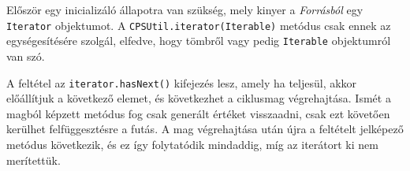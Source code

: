 Először egy inicializáló állapotra van szükség, mely kinyer a \textit{Forrásból} egy \texttt{Iterator} objektumot. A \texttt{CPSUtil.iterator(Iterable)} metódus csak ennek az egységesítésére szolgál, elfedve, hogy tömbről vagy pedig \texttt{Iterable} objektumról van szó. 

A feltétel az \texttt{iterator.hasNext()} kifejezés lesz, amely ha teljesül, akkor előállítjuk a következő elemet, és következhet a ciklusmag végrehajtása. Ismét a magból képzett metódus fog csak generált értéket visszaadni, csak ezt követően kerülhet felfüggesztésre a futás. A mag végrehajtása után újra a feltételt jelképező metódus következik, és ez így folytatódik mindaddig, míg az iterátort ki nem merítettük.
